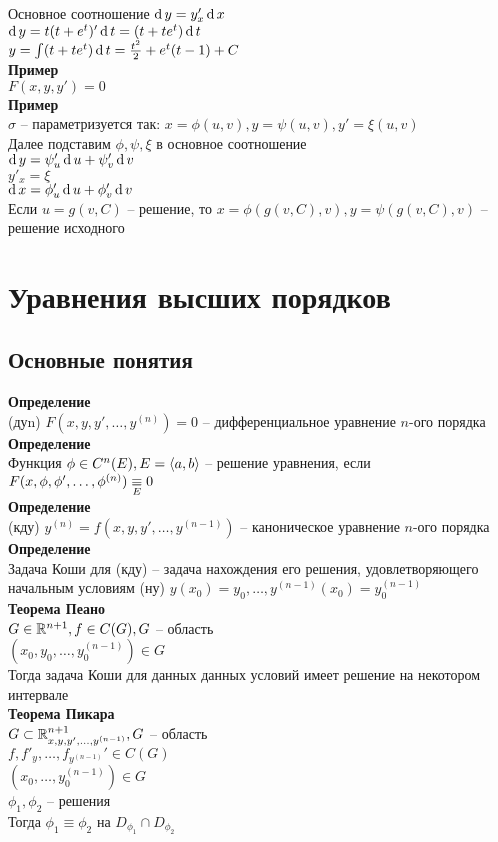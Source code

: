 \documentclass[12pt]{article}
\begin{document}
Основное соотношение $\operatorname{d} y = y'_x\operatorname{d} x$\\
$\operatorname{d} y = t(t+e^t)'\operatorname{d} t = (t+te^t)\operatorname{d} t$\\
$y = \int (t+te^t)\operatorname{d} t = \frac{t^2}2 + e^t(t-1)+C$\\
\textbf{Пример}\\
$F(x,y,y') = 0$\\
\textbf{Пример}\\
$\sigma$ -- параметризуется так: $x=\phi(u,v), y = \psi(u,v), y'=\xi(u,v)$\\
Далее подставим $\phi,\psi,\xi$ в основное соотношение\\
$\operatorname{d} y = \psi'_u\operatorname{d} u + \psi'_v\operatorname{d} v$\\
$y'_x = \xi$\\
$\operatorname{d} x = \phi'_u\operatorname{d} u + \phi'_v\operatorname{d} v$\\
Если $u=g(v,C)$ -- решение, то $x = \phi(g(v, C), v), y=\psi(g(v,C), v)$ -- решение исходного
\section{Уравнения высших порядков}
\subsection{Основные понятия}
\textbf{Определение}\\
(дуn) $F(x,y,y', \ldots, y^{(n)}) = 0$ -- дифференциальное уравнение $n$-ого порядка\\
\textbf{Определение}\\
Функция $\phi\in C^n(E), E = \langle a, b \rangle$ -- решение уравнения, если $F(x, \phi, \phi', \ldots, \phi^{(n)}) \underset E\equiv 0$\\
\textbf{Определение}\\
(кду) $y^{(n)} = f(x, y, y', \ldots, y^{(n-1)})$ -- каноническое уравнение $n$-ого порядка\\
\textbf{Определение}\\
Задача Коши для (кду) -- задача нахождения его решения, удовлетворяющего начальным условиям (ну) $y(x_0) = y_0, \ldots, y^{(n-1)}(x_0) = y_0^{(n-1)}$\\
\textbf{Теорема Пеано}\\
$G \in \mathbb{R}^{n+1}, f \in C(G), G$ -- область\\
$(x_0, y_0, \ldots, y_0^{(n-1)}) \in G$\\
Тогда задача Коши для данных данных условий имеет решение на некотором интервале\\
\textbf{Теорема Пикара}\\
$G \subset \mathbb{R}^{n+1}_{x, y, y', \ldots, y^{(n-1)}}, G$ -- область\\
$f, f'_y, \ldots, f_{y^{(n-1)}}' \in C(G)$\\
$(x_0, \ldots, y_0^{(n-1)}) \in G$\\
$\phi_1, \phi_2$ -- решения\\
Тогда $\phi_1 \equiv \phi_2$ на $D_{\phi_1} \cap D_{\phi_2}$
\end{document}
